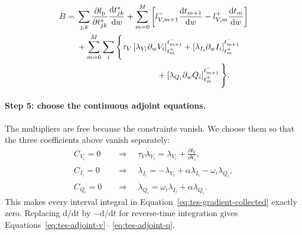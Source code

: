 \begin{align}
    B={}&
      \sum_{j,k}
       \frac{\partial l_{\mathrm p}}{\partial t^s_{jk}}
       \frac{\mathrm dt^s_{jk}}{\mathrm dw}
      +\sum_{m=0}^{M}\left[
       l_{V,m+1}^-\frac{\mathrm dt_{m+1}}{\mathrm dw}
       -l_{V,m}^+\frac{\mathrm dt_m}{\mathrm dw}
      \right]
      \nonumber\\
    &+\sum_{m=0}^{M}\sum_i\Bigg\{
      \tau_V\left[
        \lambda_{V_i}\partial_wV_i
      \right]_{t_m^+}^{t_{m+1}^-}
      +\left[
        \lambda_{I_i}\partial_wI_i
      \right]_{t_m^+}^{t_{m+1}^-}
      \nonumber\\
    &\hspace{34mm}
      +\left[
        \lambda_{Q_i}\partial_wQ_i
      \right]_{t_m^+}^{t_{m+1}^-}
      \Bigg\}.
    \label{eq:tes-complete-boundary-remainder}
\end{align}

\paragraph{Step 5: choose the continuous adjoint equations.}
The multipliers are free because the constraints vanish. We choose them so
that the three coefficients above vanish separately:
\begin{align}
    C_{V_i}=0
      &\quad\Longrightarrow\quad
      \tau_V\dot\lambda_{V_i}
        =\lambda_{V_i}+\frac{\partial l_V}{\partial V_i},
        \label{eq:tes-forward-time-adjoint-v}\\
    C_{I_i}=0
      &\quad\Longrightarrow\quad
      \dot\lambda_{I_i}
        =-\lambda_{V_i}+\alpha\lambda_{I_i}
         -\omega_i\lambda_{Q_i},
        \label{eq:tes-forward-time-adjoint-i}\\
    C_{Q_i}=0
      &\quad\Longrightarrow\quad
      \dot\lambda_{Q_i}
        =\omega_i\lambda_{I_i}+\alpha\lambda_{Q_i}.
        \label{eq:tes-forward-time-adjoint-q}
\end{align}
This makes every interval integral in
Equation~\eqref{eq:tes-gradient-collected} exactly zero. Replacing
$\mathrm d/\mathrm dt$ by $-\mathrm d/\mathrm dt$ for reverse-time
integration gives Equations~\eqref{eq:tes-adjoint-v}--
\eqref{eq:tes-adjoint-q}.

